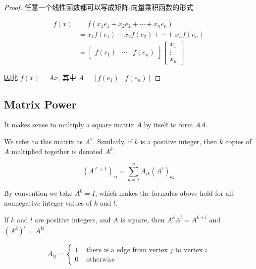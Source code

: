 \begin{proof}
    
    
    任意一个线性函数都可以写成矩阵-向量乘积函数的形式

    \begin{equation} \begin{aligned} f(x) &=f\left(x_{1} e_{1}+x_{2} e_{2}+\cdots+x_{n} e_{n}\right) \\ &=x_{1} f\left(e_{1}\right)+x_{2} f\left(e_{2}\right)+\cdots+x_{n} f\left(e_{n}\right) \\ &=\left[\begin{array}{lll}f\left(e_{1}\right) & \cdots & f\left(e_{n}\right)\end{array}\right]\left[\begin{array}{c}x_{1} \\ \vdots \\ x_{n}\end{array}\right] \end{aligned} \end{equation}

    因此 $ f(x)=A x $, 其中 $ A=\left[f\left(e_{1}\right) \ldots f\left(e_{n}\right)\right] $
\end{proof}

\subsection{Matrix Power}
It makes sense to multiply a square matrix $ A $ by itself to form $ A A $. 
\begin{definition}
    We refer to this matrix as $ A^{2} $. Similarly, if $ k $ is a positive integer, then $ k $ copies of $ A $ multiplied together is denoted $ A^{k} $. 
    
    \begin{equation} \left(A^{\ell+1}\right)_{i j}=\sum_{k=1}^{n} A_{i k}\left(A^{\ell}\right)_{k j} \end{equation}

    By convention we take $ A^{0}=I $, which makes the
    formulas above hold for all nonnegative integer values of $k$ and $l$.
\end{definition}

\begin{theorem}
    If $ k $ and $ l $ are positive integers, and $ A $ is square, then $ A^{k} A^{l}=A^{k+l} $ and $ \left(A^{k}\right)^{l}=A^{k l} $.
\end{theorem}

 \begin{example}
        \begin{equation} A_{i j}=\left\{\begin{array}{ll}1 & \text { there is a edge from vertex } j \text { to vertex } i \\ 0 & \text { otherwise }\end{array}\right. \end{equation}
\end{example}

